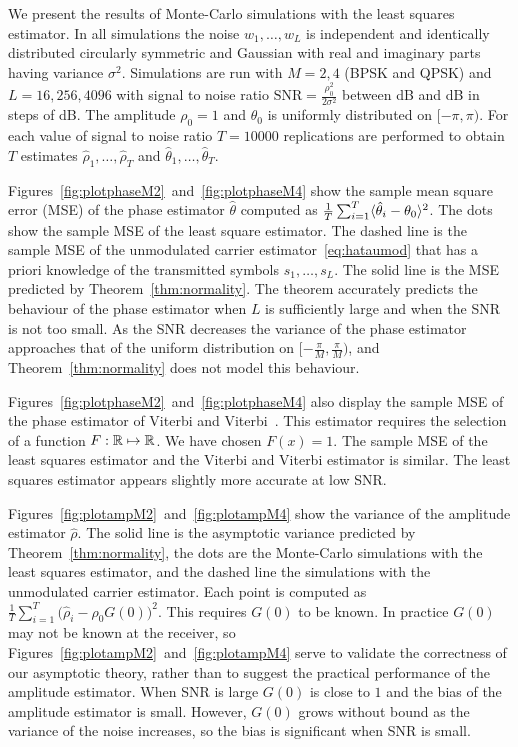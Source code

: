 \documentclass{article}
\begin{document}
We present the results of Monte-Carlo simulations with the least squares estimator.  In all simulations the noise $w_1,\dots,w_L$ is independent and identically distributed circularly symmetric and Gaussian with real and imaginary parts having variance $\sigma^2$.  Simulations are run with $M=2,4$ (BPSK and QPSK) and $L=16,256,4096$ with signal to noise ratio $\text{SNR} = \tfrac{\rho_0^2}{2\sigma^2}$ between \unit[-20]{dB} and \unit[20]{dB} in steps of \unit[1]{dB}.  The amplitude $\rho_0=1$ and $\theta_0$ is uniformly distributed on $[-\pi, \pi)$.  For each value of signal to noise ratio $T = 10000$ replications are performed to obtain $T$ estimates $\hat{\rho}_1, \dots, \hat{\rho}_T$ and $\hat{\theta}_1, \dots, \hat{\theta}_T$.  

Figures~\ref{fig:plotphaseM2}~and~\ref{fig:plotphaseM4} show the sample mean square error (MSE) of the phase estimator $\hat{\theta}$ computed as $\tfrac{1}{T}\sum_{i=1}^T\langle \hat{\theta}_i - \theta_0 \rangle^2$.  The dots show the sample MSE of the least square estimator.  The dashed line is the sample MSE of the unmodulated carrier estimator~\eqref{eq:hataumod} that has a priori knowledge of the transmitted symbols $s_1, \dots, s_L$.  %
The solid line is the MSE predicted by Theorem~\ref{thm:normality}.  The theorem accurately predicts the behaviour of the phase estimator when $L$ is sufficiently large and when the SNR is not too small.  As the SNR decreases the variance of the phase estimator approaches that of the uniform distribution on $[-\tfrac{\pi}{M}, \tfrac{\pi}{M})$, and Theorem~\ref{thm:normality} does not model this behaviour.  %

Figures~\ref{fig:plotphaseM2}~and~\ref{fig:plotphaseM4} also display the sample MSE of the phase estimator of Viterbi and Viterbi~\cite{ViterbiViterbi_phase_est_1983}.  This estimator requires the selection of a function $F : {\mathbb R} \mapsto {\mathbb R}$.  We have chosen $F(x) = 1$.  The sample MSE of the least squares estimator and the Viterbi and Viterbi estimator is similar.  The least squares estimator appears slightly more accurate at low SNR.


Figures~\ref{fig:plotampM2}~and~\ref{fig:plotampM4} show the variance of the amplitude estimator $\hat{\rho}$.   The solid line is the asymptotic variance predicted by Theorem~\ref{thm:normality}, the dots are the Monte-Carlo simulations with the least squares estimator, and the dashed line the simulations with the unmodulated carrier estimator.  Each point is computed as $\tfrac{1}{T}\sum_{i=1}^T\big(\hat{\rho}_i - \rho_0G(0)\big)^2$.  This requires $G(0)$ to be known.  In practice $G(0)$ may not be known at the receiver, so Figures~\ref{fig:plotampM2}~and~\ref{fig:plotampM4} serve to validate the correctness of our asymptotic theory, rather than to suggest the practical performance of the amplitude estimator.  When SNR is large $G(0)$ is close to $1$ and the bias of the amplitude estimator is small.  However, $G(0)$ grows without bound as the variance of the noise increases, so the bias is significant when SNR is small.
\end{document}
